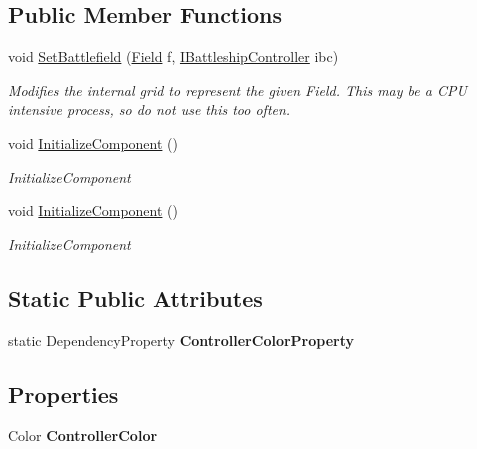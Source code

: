 \subsection*{Public Member Functions}
\begin{DoxyCompactItemize}
\item 
void \hyperlink{class_m_b_c_1_1_w_p_f_1_1_field_control_a2f7f336f27ae6c9517c54fcb142120b1}{Set\-Battlefield} (\hyperlink{class_m_b_c_1_1_core_1_1_field}{Field} f, \hyperlink{interface_m_b_c_1_1_core_1_1_i_battleship_controller}{I\-Battleship\-Controller} ibc)
\begin{DoxyCompactList}\small\item\em Modifies the internal grid to represent the given Field. This may be a C\-P\-U intensive process, so do not use this too often.\end{DoxyCompactList}\item 
void \hyperlink{class_m_b_c_1_1_w_p_f_1_1_field_control_ad69b8fbbb09f421a3a639c41f1e909d4}{Initialize\-Component} ()
\begin{DoxyCompactList}\small\item\em Initialize\-Component \end{DoxyCompactList}\item 
void \hyperlink{class_m_b_c_1_1_w_p_f_1_1_field_control_ad69b8fbbb09f421a3a639c41f1e909d4}{Initialize\-Component} ()
\begin{DoxyCompactList}\small\item\em Initialize\-Component \end{DoxyCompactList}\end{DoxyCompactItemize}
\subsection*{Static Public Attributes}
\begin{DoxyCompactItemize}
\item 
\hypertarget{class_m_b_c_1_1_w_p_f_1_1_field_control_a857a98b4eb4c41c1e72ffee5b30350b0}{static Dependency\-Property {\bfseries Controller\-Color\-Property}}\label{class_m_b_c_1_1_w_p_f_1_1_field_control_a857a98b4eb4c41c1e72ffee5b30350b0}

\end{DoxyCompactItemize}
\subsection*{Properties}
\begin{DoxyCompactItemize}
\item 
\hypertarget{class_m_b_c_1_1_w_p_f_1_1_field_control_a177e271e203fe5feba6766535886195b}{Color {\bfseries Controller\-Color}}\label{class_m_b_c_1_1_w_p_f_1_1_field_control_a177e271e203fe5feba6766535886195b}

\end{DoxyCompactItemize}


